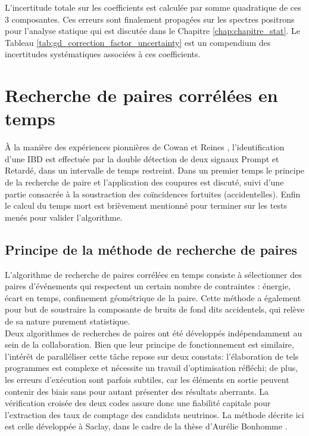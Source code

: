 L'incertitude totale sur les coefficients est calculée par somme quadratique de ces 3 composantes. Ces erreurs sont finalement propagées sur les spectres positrons pour l'analyse statique qui est discutée dans le Chapitre \ref{chap:chapitre_stat}. Le Tableau \ref{tab:gd_correction_factor_uncertainty} est un compendium des incertitudes systématiques associées à ces coefficients.

\bigbreak

\section{Recherche de paires corrélées en temps}

À la manière des expériences pionnières de Cowan et Reines \cite{Reines:1953kf}, l'identification d'une IBD est effectuée par la double détection de deux signaux Prompt et Retardé, dans un intervalle de temps restreint. Dans un premier temps le principe de la recherche de paire et l'application des coupures est discuté, suivi d'une partie consacrée à la soustraction des coïncidences fortuites (accidentelles). Enfin le calcul du temps mort est brièvement mentionné pour terminer sur les tests menés pour valider l'algorithme.

\subsection{Principe de la méthode de recherche de paires}

L'algorithme de recherche de paires corrélées en temps consiste à sélectionner des paires d'événements qui respectent un certain nombre de contraintes : énergie, écart en temps, confinement géométrique de la paire. Cette méthode a également pour but de soustraire la composante de bruits de fond dits accidentels, qui relève de sa nature purement statistique.\\

Deux algorithmes de recherches de paires ont été développés indépendamment au sein de la collaboration. Bien que leur principe de fonctionnement est similaire, l'intérêt de paralléliser cette tâche repose sur deux constats: l'élaboration de tels programmes est complexe et nécessite un travail d'optimisation réfléchi; de plus, les erreurs d'exécution sont parfois subtiles, car les éléments en sortie peuvent contenir des biais sans pour autant présenter des résultats aberrants. La vérification croisée des deux codes assure donc une fiabilité capitale pour l'extraction des taux de comptage des candidats neutrinos. La méthode décrite ici est celle développée à Saclay, dans le cadre de la thèse d'Aurélie Bonhomme \cite{bonhomme:tel-01931309}.\\


